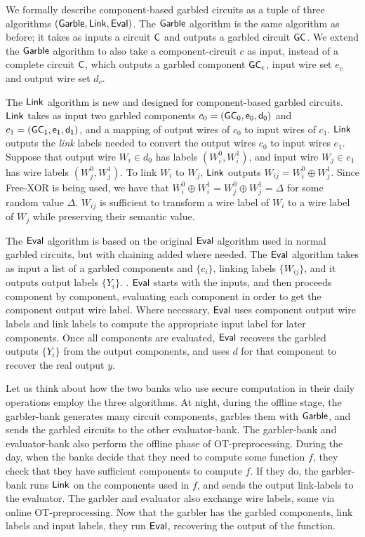 We formally describe component-based garbled circuits as a tuple of three algorithms $(\sf{Garble}, \sf{Link}, \sf{Eval})$.
The $\sf{Garble}$ algorithm is the same algorithm as before; it takes as inputs a circuit $\sf {C}$ and outputs a garbled circuit $\sf {GC}$. 
We extend the $\sf{Garble}$ algorithm to also take a component-circuit $c$ as input, instead of a complete circuit $\sf {C}$, which outputs a garbled component $\sf {GC}_c$, input wire set $e_c$ and output wire set $d_c$. 

The $\sf{Link}$ algorithm is new and designed for component-based garbled circuits. 
$\sf{Link}$ takes as input two garbled components $c_0 = (\sf {GC}_0, e_0, d_0)$ and $c_1 = (\sf {GC}_1, e_1, d_1)$, and a mapping of output wires of $c_0$ to input wires of $c_1$. 
$\sf{Link}$ outputs the \textit{link} labels needed to convert the output wires $c_0$ to input wires $e_1$. 
Suppose that output wire $W_i \in d_0$ has labels $(W_i^0, W_i^1)$, and input wire $W_j \in e_1$ has wire labels $(W_j^0, W_j^1)$.
To link $W_i$ to $W_j$, $\sf{Link}$ outputs $W_{ij} = W_i^0 \oplus W_j^1$. 
Since Free-XOR is being used, we have that $W_i^0 \oplus W_i^1 = W_j^0 \oplus W_j^1 = \Delta$ for some random value $\Delta$.
$W_{ij}$ is sufficient to transform a wire label of $W_i$ to a wire label of $W_j$ while preserving their semantic value. 

The $\sf{Eval}$ algorithm is based on the original $\sf{Eval}$ algorithm used in normal garbled circuits, but with chaining added where needed.
The $\sf{Eval}$ algorithm takes as input a list of a garbled components and $\{c_i\}$, linking labels $\{W_{ij}\}$, and it outputs output labels $\{Y_i\}$. 
.
$\sf{Eval}$ starts with the inputs, and then proceeds component by component, evaluating each component in order to get the component output wire label.
Where necessary, $\sf{Eval}$ uses component output wire labels and link labels to compute the appropriate input label for later components. 
Once all components are evaluated, $\sf{Eval}$ recovers the garbled outputs $\{Y_i\}$ from the output components, and uses $d$ for that component to recover the real output $y$. 

Let us think about how the two banks who use secure computation in their daily operations employ the three algorithms.
At night, during the offline stage, the garbler-bank generates many circuit components, garbles them with $\sf{Garble}$, and sends the garbled circuits to the other evaluator-bank. 
The garbler-bank and evaluator-bank also perform the offline phase of OT-preprocessing.
During the day, when the banks decide that they need to compute some function $f$, they check that they have sufficient components to compute $f$. 
If they do, the garbler-bank runs $\sf{Link}$ on the components used in $f$, and sends the output link-labels to the evaluator. 
The garbler and evaluator also exchange wire labels, some via online OT-preprocessing. 
Now that the garbler has the garbled components, link labels and input labels, they run $\sf{Eval}$, recovering the output of the function.

